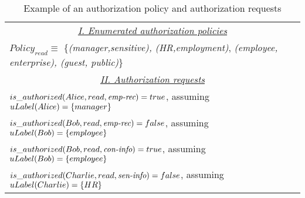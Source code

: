 \begin{table}[t]
\centering
\caption{Example of an authorization policy and authorization requests}
\label{tab:example-auth-policy}
\begin{tabular}{|l|}
	\hline
\multicolumn{1}{|c|}{\textit{\underline{I. Enumerated authorization policies}}} \\   
$Policy_{read} \equiv$ \{\textit{(manager,sensitive), (HR,employment)}, \textit{(employee, enterprise), (guest, public)}\}\\ \hline

\multicolumn{1}{|c|}{\textit{\underline{II. Authorization requests}}} \\   
$is\_authorized(Alice,read, \textit{emp-rec}) = true$, assuming $uLabel(Alice)=\{manager\}$\\
$is\_authorized(Bob,read, \textit{emp-rec}) = false$, assuming $uLabel(Bob)=\{employee\}$\\
$is\_authorized(Bob,read, \textit{con-info}) = true$, assuming $uLabel(Bob)=\{employee\}$\\
$is\_authorized(Charlie,read, \textit{sen-info}) = false$, assuming $uLabel(Charlie)=\{HR\}$\\
\hline
\end{tabular}
\end{table}


